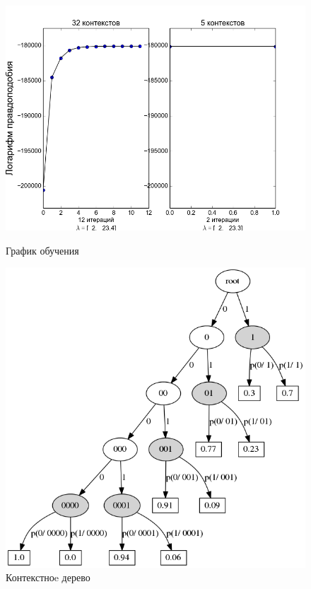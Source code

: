 \documentclass{matmex-diploma-custom}
\begin{document}
\begin{figure}[h!]\centering
\begin{minipage}[b]{0.49 \textwidth}
	\includegraphics[scale=0.47]{img/real/plot_.png}
	\centering
	\caption{ График обучения }
	\label{fig:log_likelihood}
\end{minipage}
\hfill
\begin{minipage}[b]{0.32 \textwidth}
	\includegraphics[scale=0.29]{img/real/predicted_trie.png}
	\centering
	\caption{ Контекстноe дерево }
	\label{fig:real_trie}
\end{minipage}
\end{figure}
\end{document}
